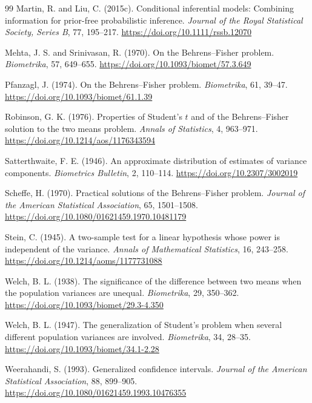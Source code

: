 \documentclass[12pt]{article}
\begin{document}
\begin{thebibliography}{99}
Martin, R. and Liu, C. (2015c).
Conditional inferential models: Combining information for prior-free
probabilistic inference.
\emph{Journal of the Royal Statistical Society, Series B}, 77, 195--217.
\newblock \href{https://doi.org/10.1111/rssb.12070}{https://doi.org/10.1111/rssb.12070}

Mehta, J. S. and Srinivasan, R. (1970).
On the Behrens--Fisher problem.
\emph{Biometrika}, 57, 649--655.
\newblock \href{https://doi.org/10.1093/biomet/57.3.649}{https://doi.org/10.1093/biomet/57.3.649}

Pfanzagl, J. (1974).
On the Behrens--Fisher problem.
\emph{Biometrika}, 61, 39--47.
\newblock \href{https://doi.org/10.1093/biomet/61.1.39}{https://doi.org/10.1093/biomet/61.1.39}

Robinson, G. K. (1976).
Properties of Student's \(t\) and of the Behrens--Fisher solution to the two
means problem.
\emph{Annals of Statistics}, 4, 963--971.
\newblock \href{https://doi.org/10.1214/aos/1176343594}{https://doi.org/10.1214/aos/1176343594}

Satterthwaite, F. E. (1946).
An approximate distribution of estimates of variance components.
\emph{Biometrics Bulletin}, 2, 110--114.
\newblock \href{https://doi.org/10.2307/3002019}{https://doi.org/10.2307/3002019}

Scheffe, H. (1970).
Practical solutions of the Behrens--Fisher problem.
\emph{Journal of the American Statistical Association}, 65, 1501--1508.
\newblock \href{https://doi.org/10.1080/01621459.1970.10481179}{https://doi.org/10.1080/01621459.1970.10481179}

Stein, C. (1945).
A two-sample test for a linear hypothesis whose power is independent of the
variance.
\emph{Annals of Mathematical Statistics}, 16, 243--258.
\newblock \href{https://doi.org/10.1214/aoms/1177731088}{https://doi.org/10.1214/aoms/1177731088}

Welch, B. L. (1938).
The significance of the difference between two means when the population
variances are unequal.
\emph{Biometrika}, 29, 350--362.
\newblock \href{https://doi.org/10.1093/biomet/29.3-4.350}{https://doi.org/10.1093/biomet/29.3-4.350}

Welch, B. L. (1947).
The generalization of Student's problem when several different population
variances are involved.
\emph{Biometrika}, 34, 28--35.
\newblock \href{https://doi.org/10.1093/biomet/34.1-2.28}{https://doi.org/10.1093/biomet/34.1-2.28}

Weerahandi, S. (1993).
Generalized confidence intervals.
\emph{Journal of the American Statistical Association}, 88, 899--905.
\newblock \href{https://doi.org/10.1080/01621459.1993.10476355}{https://doi.org/10.1080/01621459.1993.10476355}

\end{thebibliography}
\end{document}
